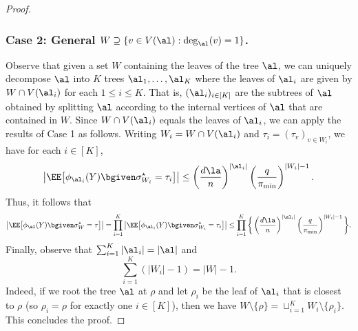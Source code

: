 \documentclass[11pt]{article}
\begin{document}
\begin{proof}
\subsubsection*{Case 2: General $W\supseteq \{v\in V(\al): \deg_{\al}(v)=1\}$.}
Observe that given a set $W$ containing the leaves of the tree $\al$, we can uniquely decompose $\al$ into $K$ trees $\al_{1},\ldots, \al_{K}$ where the leaves of $\al_i$ are given by $W\cap V(\al_i)$ for each $1\leq i \leq K$. That is, $(\al_{i})_{i\in [K]}$ are the subtrees of $\al$ obtained by splitting $\al$ according to the internal vertices of $\al$ that are contained in $W$. Since $W\cap V(\al_i)$ equals the leaves of $\al_i$, we can apply the results of Case 1 as follows. Writing $W_i= W\cap V(\al_i)$ and $\tau_i= (\tau_v)_{v\in W_i}$, we have for each $i \in [K]$,
\[
\big| \EE\big[\phi_{\al_i}(Y)\bgiven \sigma^\star_{W_i}=\tau_i\big]\big|\leq \left(\frac{d\la}{n}\right)^{|\al_i|}\left(\frac{q}{\pi_{\min}}\right)^{|W_i|-1}.
\]
Thus, it follows that
\[
\big| \EE\big[\phi_{\al}(Y)\bgiven \sigma^\star_{W}=\tau\big]\big|=\prod_{i=1}^{K} \big| \EE\big[\phi_{\al_i}(Y)\bgiven \sigma^\star_{W_i}=\tau_i\big]\big|\leq \prod_{i=1}^{K}\bigg\{\left(\frac{d\la}{n}\right)^{|\al_i|}\left(\frac{q}{\pi_{\min}}\right)^{|W_i|-1}\bigg\}.
\]
Finally, observe that $\sum_{i=1}^K|\al_i|=|\al|$ and
\[
\sum_{i=1}^{K}(|W_i|-1)=|W|-1.
\]
Indeed, if we root the tree $\al$ at $\rho$ and let $\rho_i$ be the leaf of $\al_i$ that is closest to $\rho$ (so $\rho_i=\rho$ for exactly one $i\in [K]$), then we have $W\setminus \{\rho\}=\sqcup_{i=1}^K W_i\setminus \{\rho_i\}$. This concludes the proof.
\end{proof}
\end{document}
